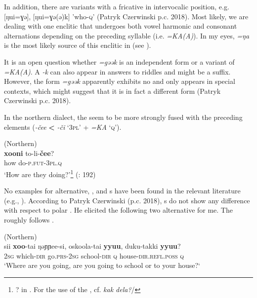 In addition, there are variants with a fricative in intervocalic position, e.g. [ŋui=ɣə], [ŋui=ɣə(ə)k] 'who-\textsc{q}' (Patryk Czerwinski p.c. 2018). Most likely, we are dealing with one enclitic that undergoes both vowel harmonic and consonant alternations depending on the preceding syllable (i.e. \textit{=KA(A)}). In my eyes,  \textit{=ŋa} is the most likely source of this enclitic in  (see ).

It is an open question whether \textit{=gəək} is an independent form or a variant of \textit{=KA(A)}. A \textit{-k} can also appear in answers to riddles and might be a suffix. However, the form \textit{=gəək} apparently exhibits no  and only appears in special contexts, which might suggest that it is in fact a different form (Patryk Czerwinski p.c. 2018).

In the northern dialect, the  seem to be more strongly fused with the preceding elements (\textit{-čee} \textbf{<} \textit{-či} ‘3\textsc{pl}’ + \textit{=KA} ‘\textsc{q}’).

\ea%
    \label{ex:tungu:61}
     (Northern)\\
    \gll \textbf{{xooni}} to-li-\textbf{{čee}}?\\
    how  do-\textsc{p.fut}-3\textsc{pl.q}\\
    \glt ‘How are they doing?’\footnote{? in . For the use of the , cf.  \textit{kak dela?}/} (\citealt{Yamada2016}: 192)
    \z

No examples for alternative, , and s have been found in the relevant literature (e.g., \citealt{Ikegami2002}). According to Patryk Czerwinski (p.c. 2018), s do not show any difference with respect to polar . He elicited the following two alternative  for me. The  roughly follows \cite{Tsumagari2009b}.

\ea%
    \label{ex:tungu:62}
     (Northern)\\
    \ea
    \gll sii \textbf{xoo}-tai ŋəɲɲee-si, oskoola-tai \textbf{yyuu}, duku-takki \textbf{yyuu}?\\
    2\textsc{sg} which-\textsc{dir} go.\textsc{prs}-2\textsc{sg} school-\textsc{dir} \textsc{q} house-\textsc{dir.refl.poss} \textsc{q}\\
    \glt ‘Where are you going, are you going to school or to your house?‘
    
